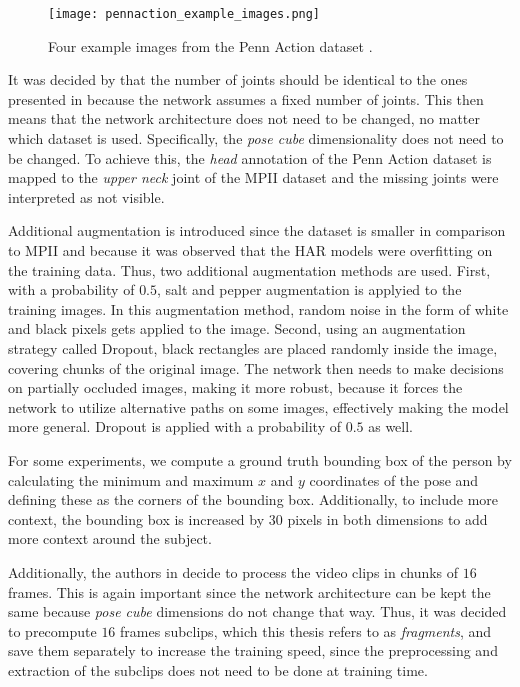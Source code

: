 \begin{figure}[htb!]
    \centering
    \texttt{[image: pennaction\_example\_images.png]}
    \caption{Four example images from the Penn Action dataset \cite{zhang_actemes_2013}. }
    \label{fig:pennaction_example_images}
\end{figure}

It was decided by \cite{luvizon_2d/3d_2018} that the number of joints should be identical to the ones presented in \cite{andriluka_2d_2014}  because the network assumes a fixed number of joints.
This then means that the network architecture does not need to be changed, no matter which dataset is used.
Specifically, the \textit{pose cube} dimensionality does not need to be changed.
To achieve this, the \textit{head} annotation of the Penn Action dataset is mapped to the \textit{upper neck} joint of the MPII dataset and the missing joints were interpreted as not visible.

Additional augmentation is introduced since the dataset is smaller in comparison to MPII and because it was observed that the HAR models were overfitting on the training data.
Thus, two additional augmentation methods are used.
First, with a probability of $0.5$, salt and pepper augmentation is applyied to the training images.
In this augmentation method, random noise in the form of white and black pixels gets applied to the image.
Second, using an augmentation strategy called Dropout, black rectangles are placed randomly inside the image, covering chunks of the original image.
The network then needs to make decisions on partially occluded images, making it more robust, because it forces the network to utilize alternative paths on some images, effectively making the model more general.
Dropout is applied with a probability of $0.5$ as well.

For some experiments, we compute a ground truth bounding box of the person by calculating the minimum and maximum $x$ and $y$ coordinates of the pose and defining these as the corners of the bounding box.
Additionally, to include more context, the bounding box is increased by $30$ pixels in both dimensions to add more context around the subject.

Additionally, the authors in \cite{luvizon_2d/3d_2018} decide to process the video clips in chunks of $16$ frames.
This is again important since the network architecture can be kept the same because \textit{pose cube} dimensions do not change that way.
Thus, it was decided to precompute $16$ frames subclips, which this thesis refers to as \textit{fragments}, and save them separately to increase the training speed, since the preprocessing and extraction of the subclips does not need to be done at training time. 

